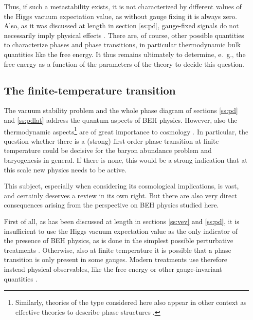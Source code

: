 \documentclass[final,12pt]{article}
\newcommand*{\1}{1\!\!\!\bot}
\begin{document}
Thus, if such a metastability exists, it is not characterized by different values of the Higgs vacuum expectation value, as without gauge fixing it is always zero. Also, as it was discussed at length in section \ref{ss:pd}, gauge-fixed signals do not necessarily imply physical effects \cite{Caudy:2007sf}. There are, of course, other possible quantities to characterize phases and phase transitions, in particular thermodynamic bulk quantities like the free energy. It thus remains ultimately to determine, e.\ g., the free energy as a function of the parameters of the theory to decide this question.

\subsection{The finite-temperature transition}\label{ss:ft}

The vacuum stability problem and the whole phase diagram of sections \ref{ss:pd} and \ref{ss:pdlat} address the quantum aspects of BEH physics. However, also the thermodynamic aspects\footnote{Similarly, theories of the type considered here also appear in other context as effective theories to describe phase structures \cite{Yamamoto:2018}.} are of great importance to cosmology \cite{Kapusta:2006pm,Dolgov:2006xi,Morrissey:2009tf}. In particular, the question whether there is a (strong) first-order phase transition at finite temperature could be decisive for the baryon abundance problem and baryogenesis in general. If there is none, this would be a strong indication that at this scale new physics needs to be active.

This subject, especially when considering its cosmological implications, is vast, and certainly deserves a review in its own right. But there are also very direct consequences arising from the perspective on BEH physics studied here.

First of all, as has been discussed at length in sections \ref{ss:vev} and \ref{ss:pd}, it is insufficient to use the Higgs vacuum expectation value as the only indicator of the presence of BEH physics, as is done in the simplest possible perturbative treatments \cite{Kapusta:2006pm}. Otherwise, also at finite temperature it is possible that a phase transition is only present in some gauges. Modern treatments use therefore instead physical observables, like the free energy or other gauge-invariant quantities \cite{DOnofrio:2015gop,Laine:2015kra,Wellegehausen:2011sc,Reichert:2017puo}.
\end{document}

